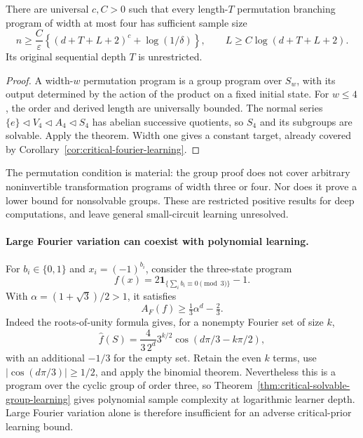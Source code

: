 \begin{corollary}
\label{cor:critical-width-four-permutation-learning}
There are universal $c,C>0$ such that every length-$T$ permutation
branching program of width at most four has sufficient sample size
\[
 n\ge\frac C\varepsilon
       \left\{(d+T+L+2)^c+\log(1/\delta)\right\},
 \qquad L\ge C\log(d+T+L+2).
\]
Its original sequential depth $T$ is unrestricted.
\end{corollary}

\begin{proof}
A width-$w$ permutation program is a group program over $S_w$, with
its output determined by the action of the product on a fixed initial
state. For $w\le4$, the order and derived length are universally bounded.
The normal series
$\{e\}\triangleleft V_4\triangleleft A_4\triangleleft S_4$
has abelian successive quotients, so $S_4$ and its subgroups are solvable.
Apply the theorem. Width one gives a constant target, already covered
by Corollary~\ref{cor:critical-fourier-learning}.
\end{proof}

The permutation condition is material: the group proof does not cover
arbitrary noninvertible transformation programs of width three or four.
Nor does it prove a lower bound for nonsolvable groups. These are
restricted positive results for deep computations, and leave general
small-circuit learning unresolved.

\paragraph{Large Fourier variation can coexist with polynomial learning.}
For $b_i\in\{0,1\}$ and $x_i=(-1)^{b_i}$, consider the three-state
program
\[
 f(x)=2\boldsymbol1_{\{\sum_i b_i\equiv0\pmod3\}}-1.
\]
With $\alpha=(1+\sqrt3)/2>1$, it satisfies
\[
 A_F(f)\ge\tfrac13\alpha^d-\tfrac23.
\]
Indeed the roots-of-unity formula gives, for a nonempty Fourier set of
size $k$,
\[
 \widehat f(S)=\frac4{3\,2^d}3^{k/2}
                   \cos(d\pi/3-k\pi/2),
\]
with an additional $-1/3$ for the empty set. Retain the even $k$ terms,
use $|\cos(d\pi/3)|\ge1/2$, and apply the binomial theorem.
Nevertheless this is a program over the cyclic group of order three,
so Theorem~\ref{thm:critical-solvable-group-learning} gives polynomial
sample complexity at logarithmic learner depth. Large Fourier variation
alone is therefore insufficient for an adverse critical-prior learning
bound.
